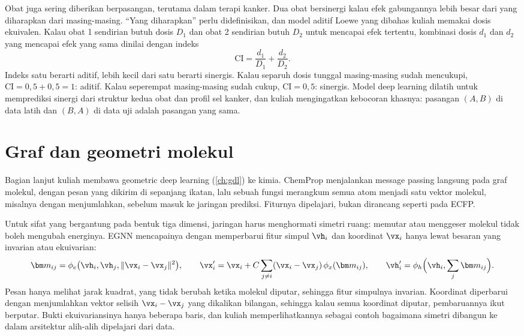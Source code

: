 Obat juga sering diberikan berpasangan, terutama dalam terapi kanker. Dua obat bersinergi kalau efek gabungannya lebih
besar dari yang diharapkan dari masing-masing. ``Yang diharapkan'' perlu didefinisikan, dan model aditif Loewe yang
dibahas kuliah memakai dosis ekuivalen. Kalau obat 1 sendirian butuh dosis $D_1$ dan obat 2 sendirian butuh $D_2$ untuk
mencapai efek tertentu, kombinasi dosis $d_1$ dan $d_2$ yang mencapai efek yang sama dinilai dengan indeks
\begin{equation}
\mathrm{CI}=\frac{d_1}{D_1}+\frac{d_2}{D_2}.
\end{equation}
Indeks satu berarti aditif, lebih kecil dari satu berarti sinergis. Kalau separuh dosis tunggal masing-masing sudah
mencukupi, $\mathrm{CI}=0{,}5+0{,}5=1$: aditif. Kalau seperempat masing-masing sudah cukup, $\mathrm{CI}=0{,}5$: sinergis.
Model deep learning dilatih untuk memprediksi sinergi dari struktur kedua obat dan profil sel kanker, dan kuliah
mengingatkan kebocoran khasnya: pasangan $(A,B)$ di data latih dan $(B,A)$ di data uji adalah pasangan yang sama.

\section{Graf dan geometri molekul}

Bagian lanjut kuliah membawa geometric deep learning (\cref{ch:gdl}) ke kimia. ChemProp \citep{yang2019} menjalankan
message passing langsung pada graf molekul, dengan pesan yang dikirim di sepanjang ikatan, lalu sebuah fungsi
 merangkum semua atom menjadi satu vektor molekul, misalnya dengan menjumlahkan, sebelum masuk ke jaringan
prediksi. Fiturnya dipelajari, bukan dirancang seperti pada ECFP.

Untuk sifat yang bergantung pada bentuk tiga dimensi, jaringan harus menghormati simetri ruang: memutar atau menggeser
molekul tidak boleh mengubah energinya. EGNN \citep{satorras2021} mencapainya dengan memperbarui fitur simpul $\vh_i$ dan
koordinat $\vx_i$ hanya lewat besaran yang invarian atau ekuivarian:
\begin{equation}
\bm m_{ij}=\phi_e\big(\vh_i,\vh_j,\|\vx_i-\vx_j\|^2\big),\qquad
\vx_i'=\vx_i+C\sum_{j\ne i}(\vx_i-\vx_j)\,\phi_x(\bm m_{ij}),\qquad
\vh_i'=\phi_h\Big(\vh_i,\sum_j\bm m_{ij}\Big).
\end{equation}
Pesan hanya melihat jarak kuadrat, yang tidak berubah ketika molekul diputar, sehingga fitur simpulnya invarian. Koordinat
diperbarui dengan menjumlahkan vektor selisih $\vx_i-\vx_j$ yang dikalikan bilangan, sehingga kalau semua koordinat diputar,
pembaruannya ikut berputar. Bukti ekuivariansinya hanya beberapa baris, dan kuliah memperlihatkannya sebagai contoh
bagaimana simetri dibangun ke dalam arsitektur alih-alih dipelajari dari data.

